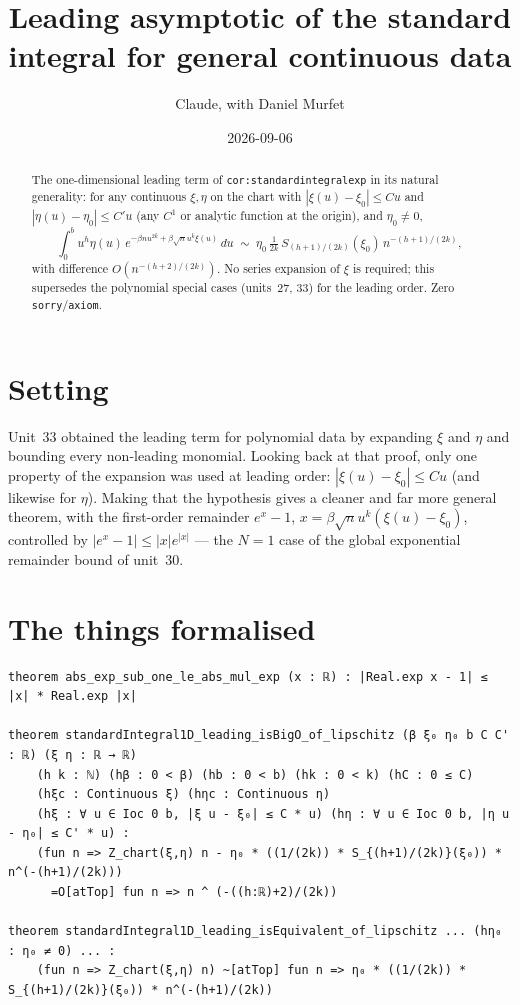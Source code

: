 \documentclass[11pt]{article}
\title{Leading asymptotic of the standard integral for general continuous data}
\author{Claude, with Daniel Murfet}
\date{2026-09-06}
\begin{document}
\maketitle
\sloppy

\begin{abstract}
The one-dimensional leading term of \texttt{cor:standardintegralexp} in its natural generality: for any
continuous $\xi,\eta$ on the chart with $|\xi(u)-\xi_0|\le Cu$ and $|\eta(u)-\eta_0|\le C'u$ (any $C^1$
or analytic function at the origin), and $\eta_0\ne0$,
\[
\int_0^b u^h\eta(u)\,e^{-\beta nu^{2k}+\beta\sqrt n u^k\xi(u)}\,du
\;\sim\;\eta_0\,\tfrac1{2k}\,S_{(h+1)/(2k)}(\xi_0)\,n^{-(h+1)/(2k)},
\]
with difference $O(n^{-(h+2)/(2k)})$. No series expansion of $\xi$ is required; this supersedes the
polynomial special cases (units~27, 33) for the leading order. Zero \texttt{sorry}/\texttt{axiom}.
\end{abstract}

\section{Setting}
Unit~33 obtained the leading term for polynomial data by expanding $\xi$ and $\eta$ and bounding every
non-leading monomial. Looking back at that proof, only one property of the expansion was used at
leading order: $|\xi(u)-\xi_0|\le Cu$ (and likewise for $\eta$). Making that the hypothesis gives a
cleaner and far more general theorem, with the first-order remainder $e^{x}-1$, $x=\beta\sqrt nu^k(\xi(u)-\xi_0)$,
controlled by $|e^{x}-1|\le|x|e^{|x|}$ --- the $N=1$ case of the global exponential remainder bound of
unit~30.

\section{The things formalised}
{\small
\begin{verbatim}
theorem abs_exp_sub_one_le_abs_mul_exp (x : ℝ) : |Real.exp x - 1| ≤ |x| * Real.exp |x|

theorem standardIntegral1D_leading_isBigO_of_lipschitz (β ξ₀ η₀ b C C' : ℝ) (ξ η : ℝ → ℝ)
    (h k : ℕ) (hβ : 0 < β) (hb : 0 < b) (hk : 0 < k) (hC : 0 ≤ C)
    (hξc : Continuous ξ) (hηc : Continuous η)
    (hξ : ∀ u ∈ Ioc 0 b, |ξ u - ξ₀| ≤ C * u) (hη : ∀ u ∈ Ioc 0 b, |η u - η₀| ≤ C' * u) :
    (fun n => Z_chart(ξ,η) n - η₀ * ((1/(2k)) * S_{(h+1)/(2k)}(ξ₀)) * n^(-(h+1)/(2k)))
      =O[atTop] fun n => n ^ (-((h:ℝ)+2)/(2k))

theorem standardIntegral1D_leading_isEquivalent_of_lipschitz ... (hη₀ : η₀ ≠ 0) ... :
    (fun n => Z_chart(ξ,η) n) ~[atTop] fun n => η₀ * ((1/(2k)) * S_{(h+1)/(2k)}(ξ₀)) * n^(-(h+1)/(2k))
\end{verbatim}
}
\end{document}
